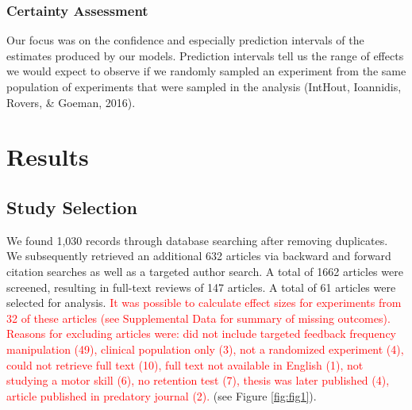 \documentclass[
  english,
  man, donotrepeattitle,mask,floatsintext]{apa7}
\begin{document}
\hypertarget{certainty-assessment}{%
\subsubsection{Certainty Assessment}\label{certainty-assessment}}

Our focus was on the confidence and especially prediction intervals of the estimates produced by our models. Prediction intervals tell us the range of effects we would expect to observe if we randomly sampled an experiment from the same population of experiments that were sampled in the analysis (IntHout, Ioannidis, Rovers, \& Goeman, 2016).

\hypertarget{results}{%
\section{Results}\label{results}}

\hypertarget{study-selection}{%
\subsection{Study Selection}\label{study-selection}}

We found 1,030 records through database searching after removing duplicates. We subsequently retrieved an additional 632 articles via backward and forward citation searches as well as a targeted author search. A total of 1662 articles were screened, resulting in full-text reviews of 147 articles. A total of 61 articles were selected for analysis. \textcolor{red}{It was possible to calculate effect sizes for experiments from 32 of these articles (see Supplemental Data for summary of missing outcomes). Reasons for excluding articles were: did not include targeted feedback frequency manipulation (49), clinical population only (3), not a randomized experiment (4), could not retrieve full text (10), full text not available in English (1), not studying a motor skill (6), no retention test (7), thesis was later published (4), article published in predatory journal (2).} (see Figure \ref{fig:fig1}).
\end{document}
